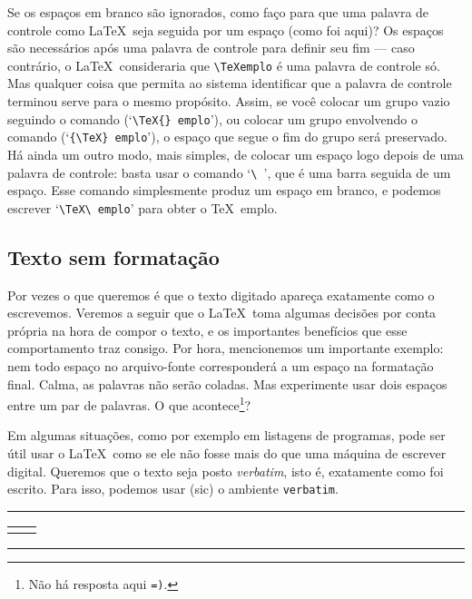 Se os espaços em branco são ignorados, como faço para que uma palavra
de controle como \LaTeX\ seja seguida por um espaço (como foi aqui)?
Os espaços são necessários após uma palavra de controle para definir
seu fim --- caso contrário, o \LaTeX\ consideraria que \verb'\TeXemplo' é
uma palavra de controle só. Mas qualquer coisa que permita ao sistema
identificar que a palavra de controle terminou serve para o mesmo
propósito. Assim, se você colocar um grupo vazio seguindo o comando
(`\verb'\TeX{} emplo''), ou colocar um grupo envolvendo o comando
(`\verb'{\TeX} emplo''), o espaço que segue o fim do grupo será
preservado. Há ainda um outro modo, mais simples, de colocar um espaço
logo depois de uma palavra de controle: basta usar o comando
`\verb'\ '', que é uma barra seguida de um espaço. Esse comando
simplesmente produz um espaço em branco, e podemos escrever
`\verb'\TeX\ emplo'' para obter o \TeX\ emplo.

\subsection{Texto sem formatação}

Por vezes o que queremos é que o texto digitado apareça exatamente
como o escrevemos. Veremos a seguir que o \LaTeX\ toma algumas
decisões por conta própria na hora de compor o texto, e os importantes
benefícios que esse comportamento traz consigo. Por hora, mencionemos
um importante exemplo: nem todo espaço no arquivo-fonte corresponderá
a um espaço na formatação final. Calma, as palavras não serão
coladas. Mas experimente usar dois espaços entre um par de palavras. O
que acontece\footnote{Não há resposta aqui \texttt{=)}.}?

Em algumas situações, como por exemplo em listagens de programas, pode
ser útil usar o \LaTeX\ como se ele não fosse mais do que uma máquina
de escrever digital. Queremos que o texto seja posto
\emph{verbatim}, isto é, exatamente como foi
escrito. Para isso, podemos usar (sic) o ambiente \verb'verbatim'.

\medskip
\begin{center}\footnotesize\hrule\smallskip
\begin{tabular}{c|c}
\begin{minipage}{.465\textwidth}

\end{minipage} &
\begin{minipage}{.465\textwidth}

\end{minipage}
\end{tabular}
\smallskip\hrule
\end{center}
\medskip

